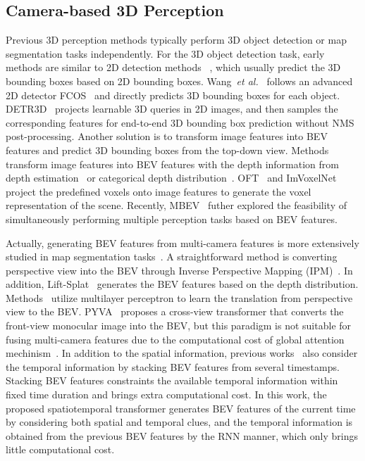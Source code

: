 \documentclass{article}
\newcommand{\etal}{\textit{et al.}}
\def\etal{{\em et al.~}}
\begin{document}
\subsection{Camera-based 3D Perception}
Previous 3D perception methods typically perform 3D object detection or map segmentation tasks independently.
For the 3D object detection task, early methods are similar to 2D detection methods ~\cite{brazil2019m3d,mousavian20173d,xu2018multi,Simonelli_2019_ICCV,zhou2019objects}, which usually predict the 3D bounding boxes based on 2D bounding boxes.
Wang~\etal\cite{wang2021fcos3d} follows an advanced 2D detector FCOS~\cite{tian2019fcos} and directly predicts 3D bounding boxes for each object. DETR3D~\cite{wang2022detr3d} projects learnable 3D queries in 2D images, and then samples the corresponding features for end-to-end 3D bounding box prediction without NMS post-processing. 
Another solution is to transform image features into BEV features and predict 3D bounding boxes from the top-down view.  Methods transform image features into BEV features with the depth information from  depth estimation~\cite{wang2019pseudo} or  categorical depth distribution~\cite{reading2021categorical}.
OFT~\cite{Roddick2019OrthographicFT} and ImVoxelNet~\cite{rukhovich2022imvoxelnet} project the predefined voxels onto image features to generate the voxel representation of the scene. Recently, MBEV~\cite{xie2022m} futher explored the feasibility of simultaneously performing multiple perception tasks based on BEV features.


Actually, generating BEV features from multi-camera features is more extensively studied in map segmentation tasks~\cite{philion2020lift,pan2020cross}. A straightforward method is converting perspective view into the BEV through Inverse Perspective Mapping (IPM)~\cite{reiher2020sim2real,can2021structured}. In addition, Lift-Splat~\cite{philion2020lift} generates the BEV features based on the depth distribution.
Methods~\cite{pan2020cross,hendy2020fishing,chitta2021neat} utilize multilayer perceptron to learn the translation from perspective view to the BEV.
PYVA~\cite{yang2021projecting} proposes a cross-view transformer that converts the front-view monocular image into the BEV, but this paradigm is not suitable for fusing multi-camera features due to the computational cost of global attention mechinism~\cite{vaswani2017attention}. In addition to the spatial information, previous works~\cite{hu2021fiery,saha2021translating,can2020understanding} also consider the temporal information  by stacking BEV features from several timestamps. Stacking BEV features constraints the available temporal information within fixed time duration and brings extra computational cost.
In this work, the proposed spatiotemporal transformer generates BEV features of the current time by considering both spatial and temporal clues, and the temporal information is obtained from the previous BEV features by the RNN manner, which only brings little computational cost.
\end{document}
